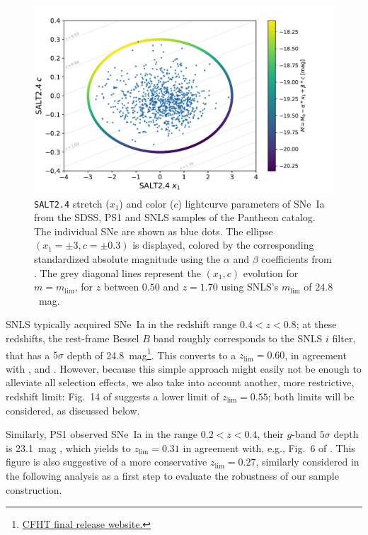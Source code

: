\documentclass[]{aa}
\newcommand{\nn}[1]{\textcolor[rgb]{0.25, 0.50, 0}{#1}}
\begin{document}
\begin{figure}
    \centering
    \includegraphics[width=0.95\linewidth]{Article_figures/zmax_maglim_snls.pdf}
    \caption{\textsc{\texttt{SALT2.4}} stretch ($x_1$) and color ($c$)
        lightcurve parameters of SNe~Ia from the SDSS, PS1 and SNLS samples of
        the Pantheon catalog. The individual SNe are shown as blue dots. The
        ellipse $(x_1=\pm3, c=\pm0.3)$ is displayed, colored by the
        corresponding standardized absolute magnitude using the $\alpha$ and
        $\beta$ coefficients from \cite{scolnic2018a}. The grey diagonal lines
        represent the $(x_1, c)$ evolution for $m = m_{\lim}$, for $z$ between
        $0.50$ and $z=1.70$ using SNLS's $m_{\lim}$ of $24.8$~mag.}
    \label{fig:maglim}
\end{figure}

SNLS typically acquired SNe~Ia in the redshift range $0.4<z<0.8$; at these
redshifts, the rest-frame Bessel $B$ band roughly corresponds to the SNLS $i$
filter, that has a $5\sigma$ depth of
24.8~mag\footnote{\href{https://www.cfht.hawaii.edu/Science/CFHTLS/cfhtlsfinalreleaseexecsummary.html}{CFHT
final release website.}}. This converts to a $z_{\lim}=0.60$, in agreement
with \cite{neill2006}, \cite{perrett2010} and \cite{bazin2011}. \nn{However,
because this simple approach might easily not be enough to alleviate all
selection effects, we also take into account another, more restrictive,
redshift limit:} Fig.~14 of \cite[][see their Section~5]{perrett2010} suggests a
lower limit of $z_{\lim}=0.55$; both limits will be considered, as discussed
below.

Similarly, PS1 observed SNe~Ia in the range $0.2<z<0.4$, their $g$-band
$5\sigma$ depth is 23.1~mag \citep{rest2014}, which yields to $z_{\lim}=0.31$ in
agreement with, e.g., Fig.~6 of \cite{scolnic2018a}. This figure is also
suggestive of a more conservative $z_{\lim}=0.27$, \nn{similarly considered in
the following analysis as a first step to evaluate the robustness of our
sample construction.}
\end{document}
